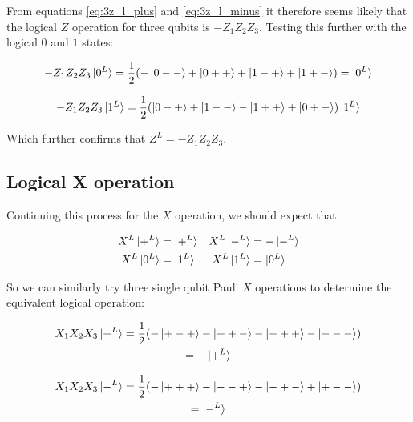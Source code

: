 From equations \eqref{eq:3z_l_plus} and \eqref{eq:3z_l_minus} it therefore seems likely that the logical $Z$ operation for three qubits is $-Z_{1}Z_{2}Z_{3}$. Testing this further with the logical $0$ and $1$ states:

\begin{equation}
- Z_{1}Z_{2}Z_{3} \ket{0^{L}} = \frac{1}{2} (- \ket{0--} + \ket{0++} + \ket{1-+} + \ket{1+-}) = \ket{0^{L}}
\end{equation}

\begin{equation}
- Z_{1}Z_{2}Z_{3} \ket{1^{L}} = \frac{1}{2} (\ket{0-+} + \ket{1--} - \ket{1++} + \ket{0+-}) \ket{1^{L}}
\end{equation}

Which further confirms that $Z^{L} = -Z_{1}Z_{2}Z_{3}$.


\subsection{Logical X operation}

Continuing this process for the $X$ operation, we should expect that:

\begin{align*}
X^{L} \ket{+^{L}} &= \ket{+^{L}} & X^{L} \ket{-^{L}} &= -\ket{-^{L}} \\
X^{L} \ket{0^{L}} &= \ket{1^{L}} & X^{L} \ket{1^{L}} &= \ket{0^{L}} \\
\end{align*}

So we can similarly try three single qubit Pauli $X$ operations to determine the equivalent logical operation:

\begin{multline}
\label{eq:3x_l_plus}
X_{1}X_{2}X_{3} \ket{+^{L}} = \frac{1}{2}(-\ket{+-+} - \ket{++-} - \ket{-++} - \ket{---}) \\
= - \ket{+^{L}} \\
\end{multline}

\begin{multline}
\label{eq:3x_l_minus}
X_{1}X_{2}X_{3} \ket{-^{L}} = \frac{1}{2}(- \ket{+++} - \ket{--+} - \ket{-+-} + \ket{+--}) \\
=  \ket{-^{L}} \\
\end{multline}

